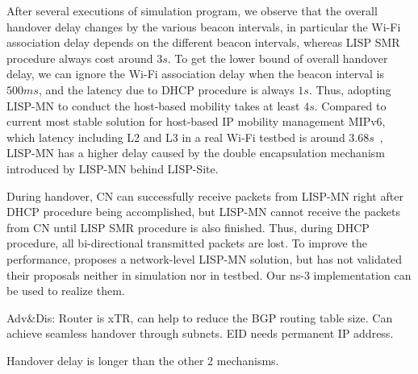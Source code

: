 After several executions of simulation program, we observe that the overall handover delay changes by the various beacon intervals, in particular the Wi-Fi association delay depends on the different beacon intervals, whereas LISP SMR procedure always cost around $3s$. To get the lower bound of overall handover delay, we can ignore the Wi-Fi association delay when the beacon interval is $500ms$, and the latency due to DHCP procedure is always $1s$. Thus, adopting LISP-MN to conduct the host-based mobility takes at least $4s$. Compared to current most stable solution for host-based IP mobility management MIPv6, which latency including L2 and L3 in a real Wi-Fi testbed is around $3.68s$~\cite{vassiliou2010analysis}, LISP-MN has a higher delay caused by the double encapsulation mechanism introduced by LISP-MN behind LISP-Site. 

During handover, CN can successfully receive packets from LISP-MN right after DHCP procedure being accomplished, but LISP-MN cannot receive the packets from CN until LISP SMR procedure is also finished. Thus, during DHCP procedure, all bi-directional transmitted packets are lost. To improve the performance, \cite{tang2017lisp} proposes a network-level LISP-MN solution, but has not validated their proposals neither in simulation nor in testbed. Our ns-3 implementation can be used to realize them.


Adv\&Dis: Router is xTR, can help to reduce the BGP routing table size. Can achieve seamless handover through subnets. EID needs permanent IP address.

Handover delay is longer than the other 2 mechanisms.







